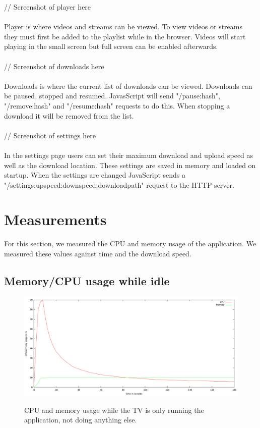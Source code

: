 // Screenshot of player here 
\\\\
Player is where videos and streams can be viewed. To view videos or streams they must first be added to the playlist while in the browser. Videos will start playing in the small screen but full screen can be enabled afterwards.
\\\\
// Screenshot of downloads here 
\\\\
Downloads is where the current list of downloads can be viewed. Downloads can be paused, stopped and resumed. JavasScript will send "/pause:hash", "/remove:hash" and "/resume:hash" requests to do this. When stopping a download it will be removed from the list. 
\\\\
// Screenshot of settings here 
\\\\
In the settings page users can set their maximum download and upload speed as well as the download location. These settings are saved in memory and loaded on startup. When the settings are changed JavaScript sends a "/settings:upspeed:downspeed:downloadpath" request to the HTTP server.


\section{Measurements}
For this section, we measured the CPU and memory usage of the application. We measured these values against time and the download speed.

\newpage
\subsection{Memory/CPU usage while idle}

\begin{center}
\begin{figure}[h]
	\centering
	\mbox{\includegraphics[width=1.2\textwidth]{Images/idle.png}}
	\label{graph:idle}
	\caption{CPU and memory usage while the TV is only running the application, not doing anything else.}
\end{figure}
\end{center}



